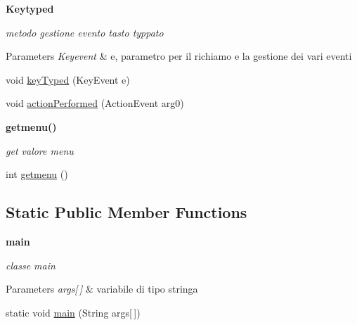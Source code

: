 \begin{Indent}\textbf{ Keytyped}\par
{\em metodo gestione evento tasto typpato


\begin{DoxyParams}{Parameters}
{\em Keyevent} & e, parametro per il richiamo e la gestione dei vari eventi \\
\hline
\end{DoxyParams}
}\begin{DoxyCompactItemize}
\item 
void \hyperlink{classcargame_1_1giocoseparato_ae9358abc251c2552e1f2c743d881df8d}{key\+Typed} (Key\+Event e)
\item 
void \hyperlink{classcargame_1_1giocoseparato_a7945fb750f69bc1a51968d0cd563cc16}{action\+Performed} (Action\+Event arg0)
\end{DoxyCompactItemize}
\end{Indent}
\begin{Indent}\textbf{ getmenu()}\par
{\em get valore menu }\begin{DoxyCompactItemize}
\item 
int \hyperlink{classcargame_1_1giocoseparato_ac9a2698ad12494cd463a2aa2cceb8b2e}{getmenu} ()
\end{DoxyCompactItemize}
\end{Indent}
\subsection*{Static Public Member Functions}
\begin{Indent}\textbf{ main}\par
{\em classe main


\begin{DoxyParams}{Parameters}
{\em args\mbox{[}$\,$\mbox{]}} & variabile di tipo stringa \\
\hline
\end{DoxyParams}
}\begin{DoxyCompactItemize}
\item 
static void \hyperlink{classcargame_1_1giocoseparato_a75988cf84fc6ee7a2ebff36e363021aa}{main} (String args\mbox{[}$\,$\mbox{]})
\end{DoxyCompactItemize}
\end{Indent}

